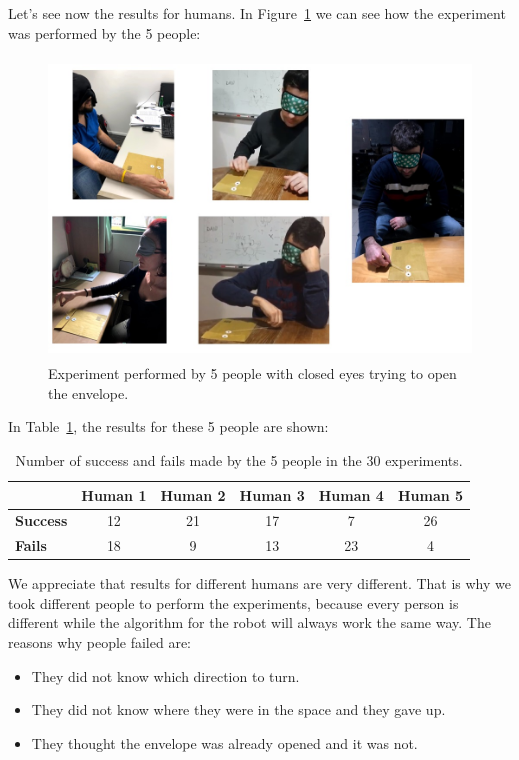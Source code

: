 Let's see now the results for humans. In Figure~\ref{fig:humans} we can see how the experiment was performed by the 5 people:
\begin{figure}[h!]
	\centering
	\includegraphics[height=80mm]{chapters/figures/experiments/exp4_humans.jpg}
	\caption{Experiment performed by 5 people with closed eyes trying to open the envelope.}
	\label{fig:humans}
\end{figure}

In Table~\ref{tab:humans}, the results for these 5 people are shown:\newline
\begin{table}[h!]
	\centering
	\begin{tabular}{|l|c|c|c|c|c|}
		\cmidrule{2-6}    \multicolumn{1}{r|}{} & \textbf{Human 1} & \textbf{Human 2} & \textbf{Human 3} & \textbf{Human 4} & \textbf{Human 5} \\
		\midrule
		\textbf{Success} & 12    & 21    & 17    & 7     & 26 \\
		\midrule
		\textbf{Fails} & 18    & 9     & 13    & 23    & 4 \\
		\bottomrule
	\end{tabular}%
	\caption{Number of success and fails made by the 5 people in the 30 experiments.}
	\label{tab:humans}%
\end{table}%

We appreciate that results for different humans are very different. That is why we took different people to perform the experiments, because every person is different while the algorithm for the robot will always work the same way.
The reasons why people failed are:
\begin{itemize}
	\item They did not know which direction to turn.
	\item They did not know where they were in the space and they gave up.
	\item They thought the envelope was already opened and it was not.
\end{itemize}

